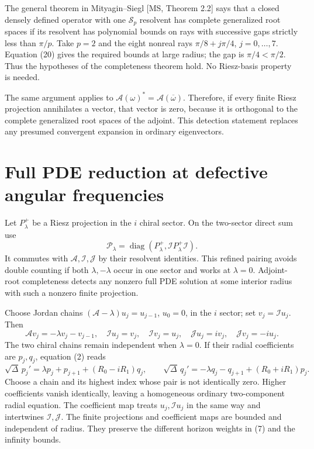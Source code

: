 \documentclass[
  10pt,
  a4paper,
]{article}
\begin{document}
The general theorem in Mityagin--Siegl {[}MS, Theorem 2.2{]} says that a
closed densely defined operator with one \(\mathcal S_p\) resolvent has
complete generalized root spaces if its resolvent has polynomial bounds
on rays with successive gaps strictly less than \(\pi/p\). Take \(p=2\)
and the eight nonreal rays \(\pi/8+j\pi/4\), \(j=0,\ldots,7\). Equation
(20) gives the required bounds at large radius; the gap is
\(\pi/4<\pi/2\). Thus the hypotheses of the completeness theorem hold.
No Riesz-basis property is needed.

The same argument applies to
\(\mathcal A(\omega)^*=\mathcal A(\overline\omega)\). Therefore, if
every finite Riesz projection annihilates a vector, that vector is zero,
because it is orthogonal to the complete generalized root spaces of the
adjoint. This detection statement replaces any presumed convergent
expansion in ordinary eigenvectors.

\section{Full PDE reduction at defective angular
frequencies}\label{full-pde-reduction-at-defective-angular-frequencies}

Let \(P_\lambda^+\) be a Riesz projection in the \(i\) chiral sector. On
the two-sector direct sum use \[
 \mathcal P_\lambda=
 \operatorname{diag}(P_\lambda^+,\mathcal I P_\lambda^+\mathcal I).
 \tag{21}
\] It commutes with \(\mathcal A,\mathcal I,\mathcal J\) by their
resolvent identities. This refined pairing avoids double counting if
both \(\lambda,-\lambda\) occur in one sector and works at
\(\lambda=0\). Adjoint-root completeness detects any nonzero full PDE
solution at some interior radius with such a nonzero finite projection.

Choose Jordan chains \((\mathcal A-\lambda)u_j=u_{j-1}\), \(u_0=0\), in
the \(i\) sector; set \(v_j=\mathcal Iu_j\). Then \[
 \mathcal Av_j=-\lambda v_j-v_{j-1},\quad
 \mathcal Iu_j=v_j,\quad \mathcal Iv_j=u_j,\quad
 \mathcal Ju_j=iv_j,\quad \mathcal Jv_j=-iu_j .
 \tag{22}
\] The two chiral chains remain independent when \(\lambda=0\). If their
radial coefficients are \(p_j,q_j\), equation (2) reads \[
 \sqrt\Delta\,p_j'=\lambda p_j+p_{j+1}+(R_0-iR_1)q_j,\qquad
 \sqrt\Delta\,q_j'=-\lambda q_j-q_{j+1}+(R_0+iR_1)p_j .
 \tag{23}
\] Choose a chain and its highest index whose pair is not identically
zero. Higher coefficients vanish identically, leaving a homogeneous
ordinary two-component radial equation. The coefficient map treats
\(u_j,\mathcal Iu_j\) in the same way and intertwines
\(\mathcal I,\mathcal J\). The finite projections and coefficient maps
are bounded and independent of radius. They preserve the different
horizon weights in (7) and the infinity bounds.
\end{document}
